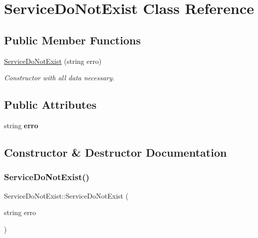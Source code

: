 \hypertarget{class_service_do_not_exist}{}\section{Service\+Do\+Not\+Exist Class Reference}
\label{class_service_do_not_exist}
\subsection*{Public Member Functions}
\begin{DoxyCompactItemize}
\item 
\hyperlink{class_service_do_not_exist_a972a9da7853eb19d42c57b8661bbbe9d}{Service\+Do\+Not\+Exist} (string erro)
\begin{DoxyCompactList}\small\item\em Constructor with all data necessary. \end{DoxyCompactList}\end{DoxyCompactItemize}
\subsection*{Public Attributes}
\begin{DoxyCompactItemize}
\item 
\mbox{\label{class_service_do_not_exist_a8915a28a1a9b0f2c85a411be65b34c91}} 
string {\bfseries erro}
\end{DoxyCompactItemize}


\subsection{Constructor \& Destructor Documentation}
\mbox{\label{class_service_do_not_exist_a972a9da7853eb19d42c57b8661bbbe9d}} 
\subsubsection{\texorpdfstring{Service\+Do\+Not\+Exist()}{ServiceDoNotExist()}}
{\footnotesize\ttfamily Service\+Do\+Not\+Exist\+::\+Service\+Do\+Not\+Exist (\begin{DoxyParamCaption}\item[{string}]{erro }\end{DoxyParamCaption})\hspace{0.3cm}{\ttfamily [inline]}}



